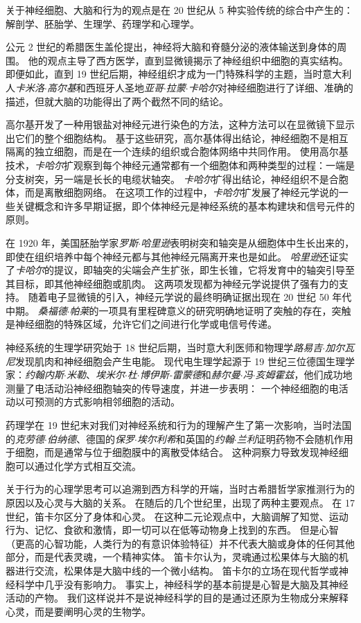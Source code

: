 关于神经细胞、大脑和行为的观点是在 20 世纪从 5 种实验传统的综合中产生的：解剖学、胚胎学、生理学、药理学和心理学。


公元 2 世纪的希腊医生盖伦提出，神经将大脑和脊髓分泌的液体输送到身体的周围。
他的观点主导了西方医学，直到显微镜揭示了神经组织中细胞的真实结构。
即便如此，直到 19 世纪后期，神经组织才成为一门特殊科学的主题，当时意大利人\textit{卡米洛$\cdot$高尔基}和西班牙人圣地\textit{亚哥$\cdot$拉蒙$\cdot$卡哈尔}对神经细胞进行了详细、准确的描述，但就大脑的功能得出了两个截然不同的结论。


高尔基开发了一种用银盐对神经元进行染色的方法，这种方法可以在显微镜下显示出它们的整个细胞结构。
基于这些研究，高尔基体得出结论，神经细胞不是相互隔离的独立细胞，而是在一个连续的组织或合胞体网络中共同作用。
使用高尔基技术，\textit{卡哈尔}扩观察到每个神经元通常都有一个细胞体和两种类型的过程：一端是分支树突，另一端是长长的电缆状轴突。 
\textit{卡哈尔}扩得出结论，神经组织不是合胞体，而是离散细胞网络。
在这项工作的过程中，\textit{卡哈尔}扩发展了神经元学说的一些关键概念和许多早期证据，即个体神经元是神经系统的基本构建块和信号元件的原则。


在 1920 年，美国胚胎学家\textit{罗斯$\cdot$哈里逊}表明树突和轴突是从细胞体中生长出来的，即使在组织培养中每个神经元都与其他神经元隔离开来也是如此。
\textit{哈里逊}还证实了\textit{卡哈尔}的提议，即轴突的尖端会产生扩张，即生长锥，它将发育中的轴突引导至其目标，即其他神经细胞或肌肉。
这两项发现都为神经元学说提供了强有力的支持。
随着电子显微镜的引入，神经元学说的最终明确证据出现在 20 世纪 50 年代中期。
\textit{桑福德$\cdot$帕莱}的一项具有里程碑意义的研究明确地证明了突触的存在，突触是神经细胞的特殊区域，允许它们之间进行化学或电信号传递。


神经系统的生理学研究始于 18 世纪后期，当时意大利医师和物理学\textit{路易吉$\cdot$加尔瓦尼}发现肌肉和神经细胞会产生电能。
现代电生理学起源于 19 世纪三位德国生理学家：\textit{约翰内斯$\cdot$米勒}、\textit{埃米尔$\cdot$杜$\cdot$博伊斯-雷蒙德}和\textit{赫尔曼$\cdot$冯$\cdot$亥姆霍兹}，他们成功地测量了电活动沿神经细胞轴突的传导速度，并进一步表明：
一个神经细胞的电活动以可预测的方式影响相邻细胞的活动。


药理学在 19 世纪末对我们对神经系统和行为的理解产生了第一次影响，当时法国的\textit{克劳德$\cdot$伯纳德}、德国的\textit{保罗$\cdot$埃尔利希}和英国的\textit{约翰$\cdot$兰利}证明药物不会随机作用于细胞，而是通常与位于细胞膜中的离散受体结合。 
这种洞察力导致发现神经细胞可以通过化学方式相互交流。


关于行为的心理学思考可以追溯到西方科学的开端，当时古希腊哲学家推测行为的原因以及心灵与大脑的关系。
在随后的几个世纪里，出现了两种主要观点。
在 17 世纪，笛卡尔区分了身体和心灵。
在这种二元论观点中，大脑调解了知觉、运动行为、记忆、食欲和激情，即一切可以在低等动物身上找到的东西。
但是心智（更高的心智功能，人类行为的有意识体验特征）并不代表大脑或身体的任何其他部分，而是代表灵魂，一个精神实体。
笛卡尔认为，灵魂通过松果体与大脑的机器进行交流，松果体是大脑中线的一个微小结构。
笛卡尔的立场在现代哲学或神经科学中几乎没有影响力。
事实上，神经科学的基本前提是心智是大脑及其神经活动的产物。
我们这样说并不是说神经科学的目的是通过还原为生物成分来解释心灵，而是要阐明心灵的生物学。


